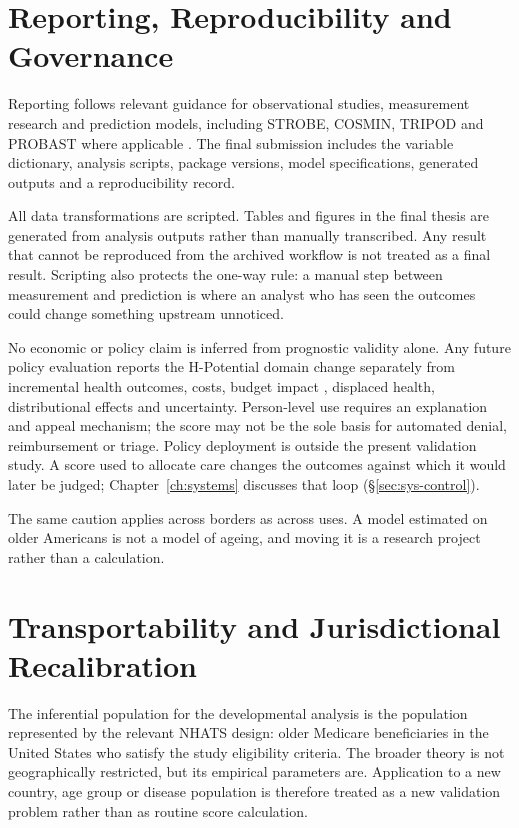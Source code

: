 \section{Reporting, Reproducibility and Governance}
\label{sec:reporting}

Reporting follows relevant guidance for observational studies, measurement research and prediction models, including STROBE, COSMIN, TRIPOD and PROBAST where applicable \citep{vonelm_2007,mokkink_2010,mokkink_2018,collins_2015,moons_2019}. The final submission includes the variable dictionary, analysis scripts, package versions, model specifications, generated outputs and a reproducibility record.

All data transformations are scripted. Tables and figures in the final thesis are generated from analysis outputs rather than manually transcribed. Any result that cannot be reproduced from the archived workflow is not treated as a final result. Scripting also protects the one-way rule: a manual step between measurement and prediction is where an analyst who has seen the outcomes could change something upstream unnoticed.

No economic or policy claim is inferred from prognostic validity alone. Any
future policy evaluation reports the H-Potential domain change separately from
incremental health outcomes, costs, budget impact \citep{sullivan_2014}, displaced health,
distributional effects and uncertainty. Person-level use requires an
explanation and appeal mechanism; the score may not be the sole basis for
automated denial, reimbursement or triage. Policy deployment is outside the
present validation study. A score used to allocate care changes the outcomes
against which it would later be judged; Chapter~\ref{ch:systems} discusses that
loop (\S\ref{sec:sys-control}).

The same caution applies across borders as across uses. A model estimated on
older Americans is not a model of ageing, and moving it is a research project
rather than a calculation.

\section{Transportability and Jurisdictional Recalibration}
\label{sec:transport}

The inferential population for the developmental analysis is the population
represented by the relevant NHATS design: older Medicare beneficiaries in the
United States who satisfy the study eligibility criteria. The broader theory is
not geographically restricted, but its empirical parameters are. Application
to a new country, age group or disease population is therefore treated as a new
validation problem rather than as routine score calculation.

